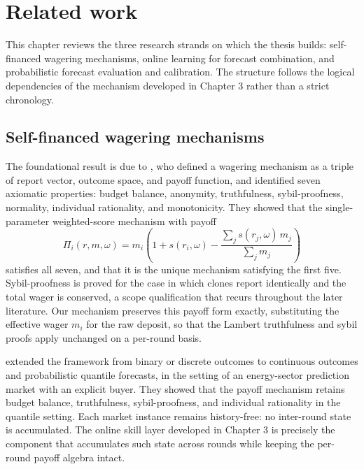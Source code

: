 \documentclass[
  11pt,
  a4paper,
  oneside]{report}
\begin{document}
\chapter{Related work}\label{ch:related}

This chapter reviews the three research strands on which the thesis
builds: self-financed wagering mechanisms, online learning for forecast
combination, and probabilistic forecast evaluation and calibration. The
structure follows the logical dependencies of the mechanism developed in
Chapter 3 rather than a strict chronology.

\section{Self-financed wagering
mechanisms}\label{self-financed-wagering-mechanisms}

The foundational result is due to \citet{lambert2008selffinanced}, who
defined a wagering mechanism as a triple of report vector, outcome
space, and payoff function, and identified seven axiomatic properties:
budget balance, anonymity, truthfulness, sybil-proofness, normality,
individual rationality, and monotonicity. They showed that the
single-parameter weighted-score mechanism with payoff \[
  \Pi_i(r, m, \omega) = m_i \left( 1 + s(r_i, \omega)
    - \frac{\sum_j s(r_j, \omega)\, m_j}{\sum_j m_j} \right)
\] satisfies all seven, and that it is the unique mechanism satisfying
the first five. Sybil-proofness is proved for the case in which clones
report identically and the total wager is conserved, a scope
qualification that recurs throughout the later literature. Our mechanism
preserves this payoff form exactly, substituting the effective wager
\(m_i\) for the raw deposit, so that the Lambert truthfulness and sybil
proofs apply unchanged on a per-round basis.

\citet{raja2024wagering} extended the framework from binary or discrete
outcomes to continuous outcomes and probabilistic quantile forecasts, in
the setting of an energy-sector prediction market with an explicit
buyer. They showed that the payoff mechanism retains budget balance,
truthfulness, sybil-proofness, and individual rationality in the
quantile setting. Each market instance remains history-free: no
inter-round state is accumulated. The online skill layer developed in
Chapter 3 is precisely the component that accumulates such state across
rounds while keeping the per-round payoff algebra intact.
\end{document}
